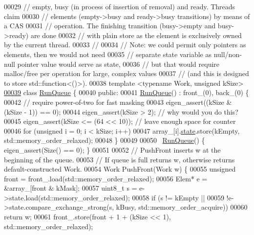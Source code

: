 \begin{DoxyCode}
00029 \textcolor{comment}{// empty, busy (in process of insertion of removal) and ready. Threads claim}
00030 \textcolor{comment}{// elements (empty->busy and ready->busy transitions) by means of a CAS}
00031 \textcolor{comment}{// operation. The finishing transition (busy->empty and busy->ready) are done}
00032 \textcolor{comment}{// with plain store as the element is exclusively owned by the current thread.}
00033 \textcolor{comment}{//}
00034 \textcolor{comment}{// Note: we could permit only pointers as elements, then we would not need}
00035 \textcolor{comment}{// separate state variable as null/non-null pointer value would serve as state,}
00036 \textcolor{comment}{// but that would require malloc/free per operation for large, complex values}
00037 \textcolor{comment}{// (and this is designed to store std::function<()>).}
00038 \textcolor{keyword}{template} <\textcolor{keyword}{typename} Work, \textcolor{keywordtype}{unsigned} kSize>
\hyperlink{class_eigen_1_1_run_queue}{00039} \textcolor{keyword}{class }\hyperlink{class_eigen_1_1_run_queue}{RunQueue} \{
00040  \textcolor{keyword}{public}:
00041   \hyperlink{class_eigen_1_1_run_queue}{RunQueue}() : front\_(0), back\_(0) \{
00042     \textcolor{comment}{// require power-of-two for fast masking}
00043     eigen\_assert((kSize & (kSize - 1)) == 0);
00044     eigen\_assert(kSize > 2);            \textcolor{comment}{// why would you do this?}
00045     eigen\_assert(kSize <= (64 << 10));  \textcolor{comment}{// leave enough space for counter}
00046     \textcolor{keywordflow}{for} (\textcolor{keywordtype}{unsigned} i = 0; i < kSize; i++)
00047       array\_[i].\hyperlink{structstate}{state}.store(kEmpty, std::memory\_order\_relaxed);
00048   \}
00049 
00050   ~\hyperlink{class_eigen_1_1_run_queue}{RunQueue}() \{ eigen\_assert(Size() == 0); \}
00051 
00052   \textcolor{comment}{// PushFront inserts w at the beginning of the queue.}
00053   \textcolor{comment}{// If queue is full returns w, otherwise returns default-constructed Work.}
00054   Work PushFront(Work w) \{
00055     \textcolor{keywordtype}{unsigned} front = front\_.load(std::memory\_order\_relaxed);
00056     Elem* e = &array\_[front & kMask];
00057     uint8\_t s = e->state.load(std::memory\_order\_relaxed);
00058     \textcolor{keywordflow}{if} (s != kEmpty ||
00059         !e->state.compare\_exchange\_strong(s, kBusy, std::memory\_order\_acquire))
00060       \textcolor{keywordflow}{return} w;
00061     front\_.store(front + 1 + (kSize << 1), std::memory\_order\_relaxed);

\end{DoxyCode}
